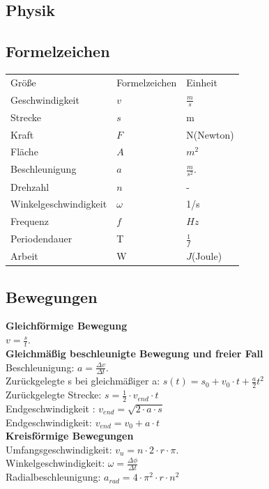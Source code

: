 \documentclass[eglish/german]{latex4ei/latex4ei_sheet}
\begin{document}
		\begin{sectionbox}
			\section{Physik}
			\subsection{Formelzeichen}
				\begin{tabular}{lll}
					Größe & Formelzeichen & Einheit\\
					Geschwindigkeit & $v$ & $\frac{m}{s}$\\
					Strecke & $s$ & m\\
					Kraft & $F$ & N(Newton)\\
					Fläche & $A$ & $m^2$\\
					Beschleunigung & $a$ & $\frac{m}{s^2}$.\\
					Drehzahl & $n$ & -\\
					Winkelgeschwindigkeit & $\omega$ & 1/s\\
					Frequenz & $f$ & $Hz$\\
					Periodendauer & T & $\frac{1}{f}$\\
					Arbeit & W & $J$(Joule)\\

				\end{tabular}
			\end{sectionbox}

			\begin{sectionbox}
				\subsection{Bewegungen}
					\textbf{Gleichförmige Bewegung}\\
					$v = \frac{s}{t}$.\\
					\textbf{Gleichmäßig beschleunigte Bewegung und freier Fall}\\
					Beschleunigung: $a = \frac{\Delta v}{\Delta t}$.\\
					Zurückgelegte s bei gleichmäßiger a:
					$s(t)=s_0 + v_0\cdot t+ \frac{a}{2}t^2$\\
					Zurückgelegte Strecke: $ s = \frac{1}{2}\cdot v_{end} \cdot t$\\
					Endgeschwindigkeit : $v_{end}=\sqrt{2 \cdot a \cdot s}$\\
					Endgeschwindigkeit: $v_{end} = v_0 + a \cdot t$\\
					\textbf{Kreisförmige Bewegungen}\\
					Umfangsgeschwindigkeit: $v_u = n \cdot 2 \cdot r \cdot \pi$.\\
					Winkelgeschwindigkeit: $\omega = \frac{\Delta\phi}{\Delta t}$\\
					Radialbeschleunigung: $a_{rad}= 4 \cdot \pi^2 \cdot r \cdot n^2$
			\end{sectionbox}
\end{document}
